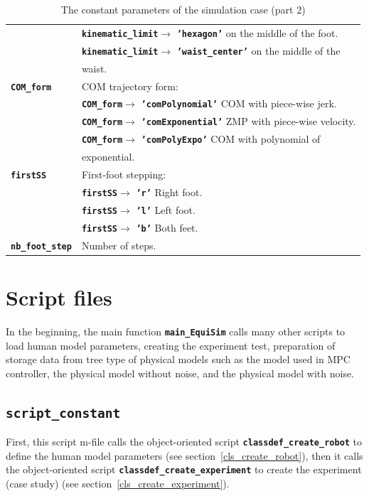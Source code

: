 \documentclass[12pt,oneside,notitlepage,abstracton,a4paper]{scrartcl}
\begin{document}
\begin{table}[!htbp]
\begin{center}
\begin{tabular}{|l|l|}
  & \textbf{\texttt{kinematic\_limit}}$\rightarrow$ \textbf{\texttt{'hexagon'}} on the middle of the foot.\\ 
  & \textbf{\texttt{kinematic\_limit}}$\rightarrow$ \textbf{\texttt{'waist\_center'}} on the middle of the\\
  & waist.\\ \hline  
  \textbf{\texttt{COM\_form}}         & COM trajectory form: \\ 
  & \textbf{\texttt{COM\_form}}$\rightarrow$ \textbf{\texttt{'comPolynomial'}} COM with piece-wise jerk.\\  
  & \textbf{\texttt{COM\_form}}$\rightarrow$ \textbf{\texttt{'comExponential'}} ZMP with piece-wise velocity.\\  
  & \textbf{\texttt{COM\_form}}$\rightarrow$ \textbf{\texttt{'comPolyExpo'}} COM with polynomial of\\
  & exponential.\\  \hline  
  \textbf{\texttt{firstSS}}         & First-foot stepping:\\ 
  & \textbf{\texttt{firstSS}}$\rightarrow$ \textbf{\texttt{'r'}} Right foot.\\  
  & \textbf{\texttt{firstSS}}$\rightarrow$ \textbf{\texttt{'l'}} Left foot.\\  
  & \textbf{\texttt{firstSS}}$\rightarrow$ \textbf{\texttt{'b'}} Both feet.\\  \hline 
 \textbf{\texttt{nb\_foot\_step}}         & Number of steps.\\ \hline  
\end{tabular}
\caption {The constant parameters of the simulation case (part 2)}
\label{tbl:paras2}
\end{center}
\end{table}
 
 
  
\nopagebreak
\pagebreak 
\section{Script files}
In the beginning, the main function \textbf{\texttt{main\_EquiSim}} calls many other scripts to load human model parameters, creating the experiment test, preparation of storage data from tree type of physical models such as the model used in MPC controller, the physical model without noise, and the physical model with noise.
\subsection{\textbf{\texttt{script\_constant}}}
First, this script m-file calls the object-oriented script \textbf{\texttt{classdef\_create\_robot}} to define the human model parameters (see section~\ref{cls_create_robot}), then it calls the object-oriented script \textbf{\texttt{classdef\_create\_experiment}} to create the experiment (case study) (see section~\ref{cls_create_experiment}).  
\end{document}
